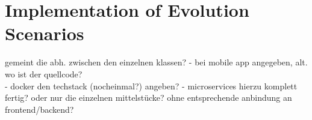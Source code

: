 \section{Implementation of Evolution Scenarios}
gemeint die abh. zwischen den einzelnen klassen?
 - bei mobile app angegeben, alt. wo ist der quellcode?\\
 - docker den techstack (nocheinmal?) angeben?
 - microservices hierzu komplett fertig? oder nur die einzelnen mittelstücke? ohne entsprechende anbindung an frontend/backend?